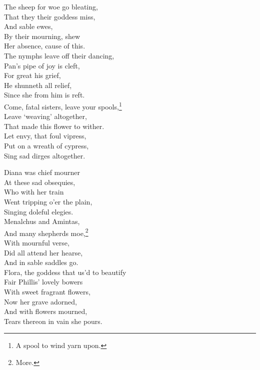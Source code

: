 \settowidth{\versewidth}{Come, fatal sisters, leave your spools,}
\begin{dcverse}
\begin{patverse}
The sheep for woe go bleating,\\
That they their goddess miss,\\
And sable ewes,\\
By their mourning, shew\\
Her absence, cause of this.\\
The nymphs leave off their dancing,\\
Pan’s pipe of joy is cleft,\\
For great his grief,\\
He shunneth all relief,\\
Since she from him is reft.\\
Come, fatal sisters, leave your spools,\footnote{\textit{}
A spool to wind yarn upon.}\\
Leave ‘weaving’ altogether,\\
That made this flower to wither.\\
Let envy, that foul vipress,\\
Put on a wreath of cypress,\\
Sing sad dirges altogether.
\end{patverse}

\begin{patverse}
Diana was chief mourner\\
At these sad obsequies,\\
Who with her train\\
Went tripping o’er the plain,\\
Singing doleful elegies.\\
Menalchus and Amintas,\\
And many shepherds moe,\footnote{\textit{}
More.}\\
With mournful verse,\\
Did all attend her hearse,\\
And in sable saddles go.\\
Flora, the goddess that us’d to beautify\\
Fair Phillis’ lovely bowers\\
With sweet fragrant flowers,\\
Now her grave adorned,\\
And with flowers mourned,\\
Tears thereon in vain she pours.
\end{patverse}


\end{dcverse}
